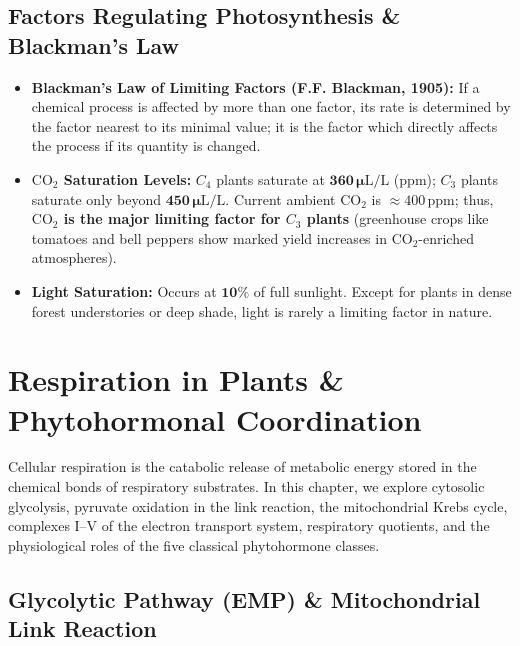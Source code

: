 \documentclass[10pt,twoside,openright]{book}
\begin{document}
\section{Factors Regulating Photosynthesis \& Blackman's Law}

\begin{trapbox}
\begin{itemize}[leftmargin=*]
  \item \textbf{Blackman's Law of Limiting Factors (F.F. Blackman, 1905):} If a chemical process is affected by more than one factor, its rate is determined by the factor nearest to its minimal value; it is the factor which directly affects the process if its quantity is changed.
  \item \textbf{$\mathrm{CO}_2$ Saturation Levels:} $C_4$ plants saturate at $\mathbf{360\,\mu\mathrm{L/L}}$ ($\mathrm{ppm}$); $C_3$ plants saturate only beyond $\mathbf{450\,\mu\mathrm{L/L}}$. Current ambient $\mathrm{CO}_2$ is $\approx 400\,\mathrm{ppm}$; thus, \textbf{$\mathrm{CO}_2$ is the major limiting factor for $C_3$ plants} (greenhouse crops like tomatoes and bell peppers show marked yield increases in $\mathrm{CO}_2$-enriched atmospheres).
  \item \textbf{Light Saturation:} Occurs at $\mathbf{10\%}$ of full sunlight. Except for plants in dense forest understories or deep shade, light is rarely a limiting factor in nature.
\end{itemize}
\end{trapbox}

\chapter{Respiration in Plants \& Phytohormonal Coordination}

Cellular respiration is the catabolic release of metabolic energy stored in the chemical bonds of respiratory substrates. In this chapter, we explore cytosolic glycolysis, pyruvate oxidation in the link reaction, the mitochondrial Krebs cycle, complexes I--V of the electron transport system, respiratory quotients, and the physiological roles of the five classical phytohormone classes.

\section{Glycolytic Pathway (EMP) \& Mitochondrial Link Reaction}
\end{document}
